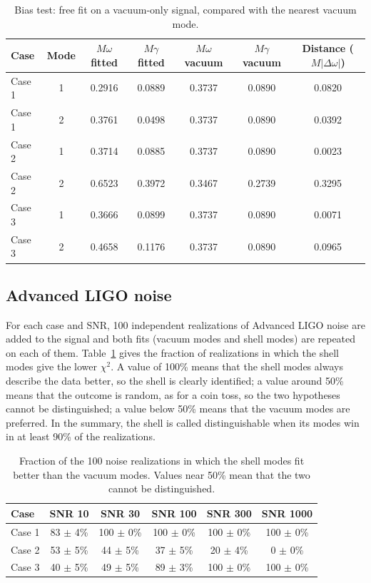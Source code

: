 \documentclass[11pt,a4paper]{article}
\begin{document}
\begin{table}[H]
\centering\small
\begin{tabular}{lcccccc}
\toprule
Case & Mode & $M\omega$ fitted & $M\gamma$ fitted & $M\omega$ vacuum & $M\gamma$ vacuum & Distance ($M|\Delta\omega|$) \\
\midrule
Case 1 & 1 & 0.2916 & 0.0889 & 0.3737 & 0.0890 & 0.0820 \\
Case 1 & 2 & 0.3761 & 0.0498 & 0.3737 & 0.0890 & 0.0392 \\
Case 2 & 1 & 0.3714 & 0.0885 & 0.3737 & 0.0890 & 0.0023 \\
Case 2 & 2 & 0.6523 & 0.3972 & 0.3467 & 0.2739 & 0.3295 \\
Case 3 & 1 & 0.3666 & 0.0899 & 0.3737 & 0.0890 & 0.0071 \\
Case 3 & 2 & 0.4658 & 0.1176 & 0.3737 & 0.0890 & 0.0965 \\
\bottomrule
\end{tabular}
\caption{Bias test: free fit on a vacuum-only signal, compared with the nearest vacuum mode.}
\end{table}

\subsection{Advanced LIGO noise}
For each case and SNR, 100 independent
realizations of Advanced LIGO noise are added to the signal and both fits (vacuum modes and shell modes) are
repeated on each of them. Table~\ref{tab:ligo} gives the fraction of realizations in which the shell modes give the
lower $\chi^2$. A value of 100\% means that the shell modes always describe the data better, so the shell is
clearly identified; a value around 50\% means that the outcome is random, as for a coin toss, so the two
hypotheses cannot be distinguished; a value below 50\% means that the vacuum modes are preferred. In the summary,
the shell is called distinguishable when its modes win in at least 90\% of the realizations.


\begin{table}[H]
\centering\small
\begin{tabular}{lccccc}
\toprule
Case & SNR 10 & SNR 30 & SNR 100 & SNR 300 & SNR 1000 \\
\midrule
Case 1 & 83 $\pm$ 4\% & 100 $\pm$ 0\% & 100 $\pm$ 0\% & 100 $\pm$ 0\% & 100 $\pm$ 0\% \\
Case 2 & 53 $\pm$ 5\% & 44 $\pm$ 5\% & 37 $\pm$ 5\% & 20 $\pm$ 4\% & 0 $\pm$ 0\% \\
Case 3 & 40 $\pm$ 5\% & 49 $\pm$ 5\% & 89 $\pm$ 3\% & 100 $\pm$ 0\% & 100 $\pm$ 0\% \\
\bottomrule
\end{tabular}
\caption{Fraction of the 100 noise realizations in which the shell modes fit better than the vacuum modes. Values near 50\% mean that the two cannot be distinguished.\label{tab:ligo}}
\end{table}
\end{document}

